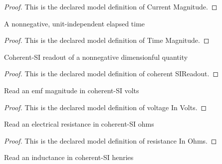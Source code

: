 \begin{proof}
  This is the declared model definition of Current Magnitude.
\end{proof}
\begin{definition}
  \label{def:physics:phyx-mini-0941:phyxminiproblems-problemphyxmini0941-timemagnitude}
  A nonnegative, unit-independent elapsed time
\end{definition}
\begin{proof}
  This is the declared model definition of Time Magnitude.
\end{proof}
\begin{definition}
  \label{def:physics:phyx-mini-0941:phyxminiproblems-problemphyxmini0941-coherentsireadout}
  Coherent-SI readout of a nonnegative dimensionful quantity
\end{definition}
\begin{proof}
  This is the declared model definition of coherent SIReadout.
\end{proof}
\begin{definition}
  \label{def:physics:phyx-mini-0941:phyxminiproblems-problemphyxmini0941-voltageinvolts}
  Read an emf magnitude in coherent-SI volts
\end{definition}
\begin{proof}
  This is the declared model definition of voltage In Volts.
\end{proof}
\begin{definition}
  \label{def:physics:phyx-mini-0941:phyxminiproblems-problemphyxmini0941-resistanceinohms}
  Read an electrical resistance in coherent-SI ohms
\end{definition}
\begin{proof}
  This is the declared model definition of resistance In Ohms.
\end{proof}
\begin{definition}
  \label{def:physics:phyx-mini-0941:phyxminiproblems-problemphyxmini0941-inductanceinhenries}
  Read an inductance in coherent-SI henries
\end{definition}

